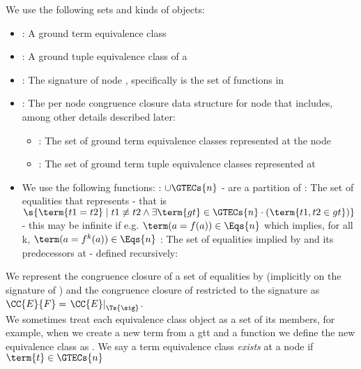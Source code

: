 We use the following sets and kinds of objects:
\begin{itemize}
	\item \GTEC : A ground term equivalence class
	\item \GTTEC : A ground tuple equivalence class
of a \GTTEC
	\item {} : The signature of node , specifically  is the set of functions in 
	\item {} : The per node congruence closure data structure for node  that includes, among other details described later:
	\begin{itemize}
		\item {} : The set of ground term equivalence classes represented at the node 
		\item {}: The set of ground term tuple equivalence classes represented at 
	\end{itemize}
	\item We use the following functions:
		\subitem {}: $\cup \GTECs{n}$ -  are a partition of 
		\subitem {} : The set of equalities that  represents - that is
		$\s{\term{t1=t2} \mid t1 \not\equiv t2 \land \exists \term{gt} \in \GTECs{n} \cdot (\term{t1,t2 \in gt})}$ -
		this may be infinite if e.g. $\term(a=f(a)) \in \Eqs{n}$ which implies, for all k, $\term(a=f^k(a)) \in \Eqs{n}$
		\subitem {} : The set of equalities implied by  and its predecessors at  -
		defined recursively: \\
\end{itemize}

We represent the congruence closure of a set of equalities  by  (implicitly on the signature of ) and the congruence closure of  restricted to the signature \sig as $\CC{E}{F}=\left.\CC{E}\right|_{\Ts{\sig}}$.\\
We sometimes treat each equivalence class object as a set of its members, for example, when we create a new term from a \GTTEC gtt and a function  we define the new equivalence class as .
We say a term equivalence class  \emph{exists} at a node  if $\term{t} \in \GTECs{n}$

